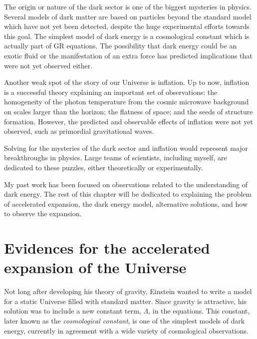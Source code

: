     The origin or nature of the dark sector is one of the biggest mysteries in physics. 
    Several models of dark matter are based on particles beyond the standard model which 
    have not yet been detected, despite the huge experimental efforts towards this goal. 
    The simplest model of dark energy is a cosmological constant which is actually 
    part of GR equations. The possibility that dark energy could be an exotic fluid or 
    the manifestation of an extra force has predicted implications that were not yet 
    observed either. 

    Another weak spot of the story of our Universe is inflation. 
    Up to now, inflation is a successful theory explaining an important set of observations: 
    the homogeneity of the photon temperature 
    from the cosmic microwave background on scales larger than the horizon;
    the flatness of space; and the seeds of structure formation.
    However, the predicted and observable effects of inflation were not yet observed,
    such as primordial gravitational waves.
     
    Solving for the mysteries of the dark sector and inflation 
    would represent major breakthroughs in physics. 
    Large teams of scientists, including myself, are dedicated
    to these puzzles, either theoretically or experimentally. 

    My past work has been focused on observations related to the understanding of dark energy. 
    The rest of this chapter will be dedicated to explaining the problem 
    of accelerated expansion, the dark energy model, alternative solutions,
    and how to observe the expansion. 

\section{Evidences for the accelerated expansion of the Universe}
\label{intro:evidences_acceleration}

    Not long after developing his theory of gravity, Einstein wanted to write a model 
    for a static Universe filled with standard matter. 
    Since gravity is attractive, his solution 
    was to include a new constant term, $\Lambda$, in the equations. 
    This constant, later known as the \emph{cosmological constant}, 
    is one of the simplest models of dark energy, currently
    in agreement with a wide variety of cosmological observations. 
    
